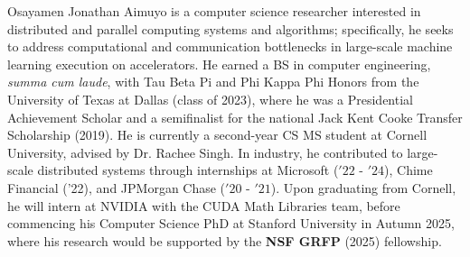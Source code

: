\begin{biosketch}
Osayamen Jonathan Aimuyo is a computer science researcher interested in distributed and parallel computing systems
and algorithms; specifically, he seeks to address computational and communication bottlenecks in
large-scale machine learning execution on accelerators.
He earned a BS in computer engineering, \textit{summa cum laude}, with Tau Beta Pi and Phi Kappa Phi Honors from the
University of Texas at Dallas (class of 2023),
where he was a Presidential Achievement Scholar and a semifinalist
for the national Jack Kent Cooke Transfer Scholarship (2019).
He is currently a second-year CS MS student at Cornell University,
advised by Dr. Rachee Singh.
In industry, he contributed to large-scale distributed systems through internships at
Microsoft (\('22\) - \('24\)), Chime Financial ('22), and JPMorgan Chase (\('20\) - \('21\)).
Upon graduating from Cornell, he will intern at NVIDIA with the CUDA Math Libraries team,
before commencing his Computer Science PhD at Stanford University in Autumn 2025, where his research
would be supported by the \textbf{NSF GRFP} (2025) fellowship.
\end{biosketch}